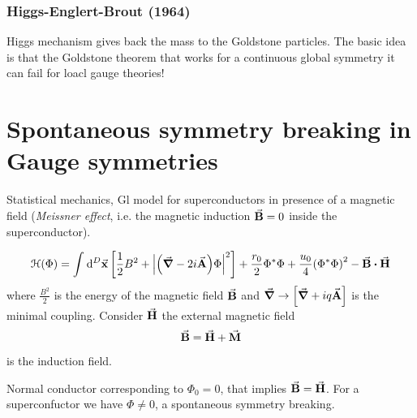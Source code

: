 \documentclass[../main/main.tex]{subfiles}
\begin{document}
\subsubsection{Higgs-Englert-Brout (1964)}
Higgs mechanism gives back the mass to the Goldstone particles.
The basic idea is that the Goldstone theorem that works for a continuous global symmetry it can fail for loacl gauge theories!

\section{Spontaneous symmetry breaking in Gauge symmetries}
Statistical mechanics, Gl model for superconductors in presence of a magnetic field (\emph{Meissner effect}, i.e. the magnetic induction \( \va{B} = 0 \) inside the superconductor).

\begin{equation}
  \mathcal{H} (\Phi ) = \int_{}^{} \dd[D]{\va{x}} \qty[\frac{1}{2}B^2 + \abs{\qty(\va{\grad }- 2 i \va{A})\Phi  }^2 ] + \frac{r_0}{2} \Phi ^* \Phi
  + \frac{u_0}{4} \qty(\Phi ^* \Phi )^2 - \va{B} \vdot \va{H}
\end{equation}
where \( \frac{B^2}{2} \) is the energy of the magnetic field \( \va{B} \) and \( \va{\grad } \rightarrow \qty[\va{\grad } + i q \va{A}]  \) is the minimal coupling.
Consider \( \va{H} \) the external magnetic field
\begin{equation}
  \va{B} = \va{H} + \va{M}
\end{equation}
is the induction field.

Normal conductor corresponding to \( \Phi _0 = 0 \), that implies \( \va{B} = \va{H} \). For a superconfuctor we have \( \Phi \neq 0 \), a spontaneous symmetry breaking.
\end{document}
